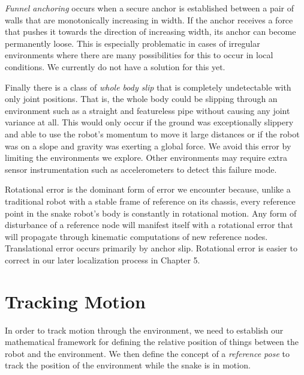 \emph{Funnel anchoring} occurs when a secure anchor is established between a pair of walls that are monotonically increasing in width. If the anchor receives a force that pushes it towards the direction of increasing width, its anchor can become permanently loose. This is especially problematic in cases of irregular environments where there are many possibilities for this to occur in local conditions. We currently do not have a solution for this yet.

Finally there is a class of \emph{whole body slip} that is completely undetectable with only joint positions. That is, the whole body could be slipping through an environment such as a straight and featureless pipe without causing any joint variance at all. This would only occur if the ground was exceptionally slippery and able to use the robot's momentum to move it large distances or if the robot was on a slope and gravity was exerting a global force. We avoid this error by limiting the environments we explore. Other environments may require extra sensor instrumentation such as accelerometers to detect this failure mode.

Rotational error is the dominant form of error we encounter because, unlike a traditional robot with a stable frame of reference on its chassis, every reference point in the snake robot's body is constantly in rotational motion. Any form of disturbance of a reference node will manifest itself with a rotational error that will propagate through kinematic computations of new reference nodes. Translational error occurs primarily by anchor slip. Rotational error is easier to correct in our later localization process in Chapter 5.

\section{Tracking Motion}
\label{trackingmotion}




In order to track motion through the environment, we need to establish our mathematical framework for defining the relative position of things between the robot and the environment. We then define the concept of a \emph{reference pose} to track the position of the environment while the snake is in motion.

